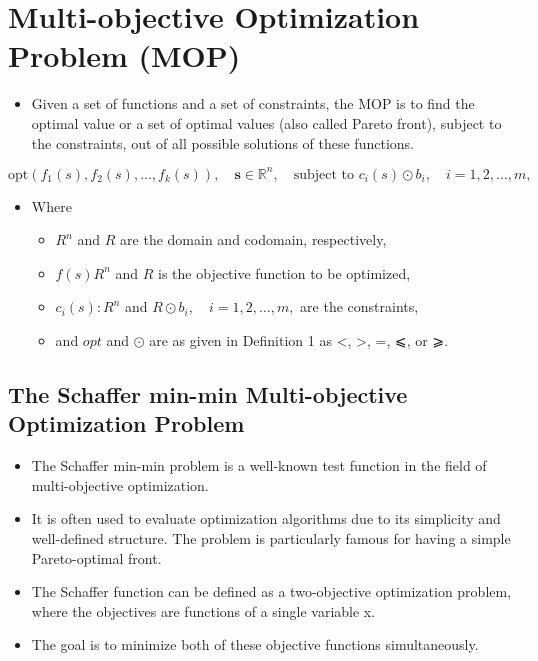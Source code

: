 \documentclass[
  letterpaper,
  DIV=11,
  numbers=noendperiod]{scrreprt}
\providecommand{\tightlist}{%
  \setlength{\itemsep}{0pt}\setlength{\parskip}{0pt}}\usepackage{longtable,booktabs,array}
\begin{document}
\section{Multi-objective Optimization Problem
(MOP)}\label{multi-objective-optimization-problem-mop}

\begin{itemize}
\tightlist
\item
  Given a set of functions and a set of constraints, the MOP is to find
  the optimal value or a set of optimal values (also called Pareto
  front), subject to the constraints, out of all possible solutions of
  these functions.
\end{itemize}

\[\text{opt}\left( f_1(s), f_2(s), \dots, f_k(s) \right),
\quad \mathbf{s} \in \mathbb{R}^n, 
\quad \text{subject to } c_i(s) \odot b_i, \quad i = 1, 2, \dots, m,\]

\begin{itemize}
\tightlist
\item
  Where

  \begin{itemize}
  \tightlist
  \item
    \({R}^n\) and \({R}\) are the domain and codomain, respectively,
  \item
    \(f(s) {R}^n\) and \({R}\) is the objective function to be
    optimized,
  \item
    \(c_i(s): {R}^n\) and \({R}\odot b_i, \quad i = 1, 2, \ldots, m,\)
    are the constraints,
  \item
    and \(opt\) and \(\odot\) are as given in Definition 1 as \textless,
    \textgreater, =, ⩽, or ⩾.
  \end{itemize}
\end{itemize}

\subsection{The Schaffer min-min Multi-objective Optimization
Problem}\label{the-schaffer-min-min-multi-objective-optimization-problem}

\begin{itemize}
\tightlist
\item
  The Schaffer min-min problem is a well-known test function in the
  field of multi-objective optimization.
\item
  It is often used to evaluate optimization algorithms due to its
  simplicity and well-defined structure. The problem is particularly
  famous for having a simple Pareto-optimal front.
\item
  The Schaffer function can be defined as a two-objective optimization
  problem, where the objectives are functions of a single variable x.
\item
  The goal is to minimize both of these objective functions
  simultaneously.
\end{itemize}
\end{document}
